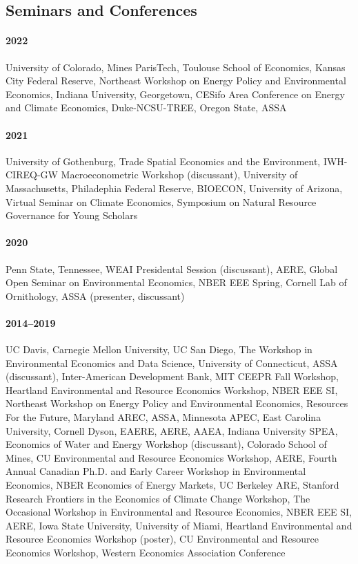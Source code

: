 \documentclass[11pt]{res} %
\begin{document}
\begin{resume}
\vspace{-.2in}

\subsection{Seminars and Conferences}\vspace{-.1in}
\paragraph{2022} University of Colorado, Mines ParisTech, Toulouse School of Economics, Kansas City Federal Reserve, Northeast Workshop on Energy Policy and Environmental Economics, Indiana University, Georgetown, CESifo Area Conference on Energy and Climate Economics, Duke-NCSU-TREE, Oregon State, ASSA \vspace{-.2in}
\paragraph{2021} University of Gothenburg, Trade Spatial Economics and the Environment, IWH-CIREQ-GW Macroeconometric Workshop (discussant), University of Massachusetts, Philadephia Federal Reserve, BIOECON, University of Arizona, Virtual Seminar on Climate Economics, Symposium on Natural Resource Governance for Young Scholars \vspace{-.2in}
\paragraph{2020} Penn State, Tennessee, WEAI Presidental Session (discussant), AERE, Global Open Seminar on Environmental Economics, NBER EEE Spring, Cornell Lab of Ornithology, ASSA (presenter, discussant) \vspace{-.2in}
\paragraph{2014--2019} UC Davis, Carnegie Mellon University, UC San Diego, The Workshop in Environmental Economics and Data Science, University of Connecticut, ASSA (discussant), Inter-American Development Bank, MIT CEEPR Fall Workshop, Heartland Environmental and Resource Economics Workshop, NBER EEE SI, Northeast Workshop on Energy Policy and Environmental Economics, Resources For the Future, Maryland AREC, ASSA, Minnesota APEC, East Carolina University, Cornell Dyson, EAERE, AERE, AAEA, Indiana University SPEA, Economics of Water and Energy Workshop (discussant), Colorado School of Mines, CU Environmental and Resource Economics Workshop, AERE, Fourth Annual Canadian Ph.D. and Early Career Workshop in Environmental Economics, NBER Economics of Energy Markets, UC Berkeley ARE, Stanford Research Frontiers in the Economics of Climate Change Workshop, The Occasional Workshop in Environmental and Resource Economics, NBER EEE SI, AERE, Iowa State University, University of Miami, Heartland Environmental and Resource Economics Workshop (poster), CU Environmental and Resource Economics Workshop, Western Economics Association Conference


\end{resume}
\end{document}
